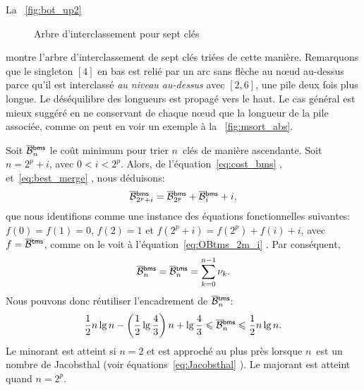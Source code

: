 La \fig~\vref{fig:bot_up2}
\begin{figure}
\centering
{}
\qquad
{}
\caption{Arbre d'interclassement pour sept clés}
\end{figure}
montre l'arbre d'interclassement
de sept clés triées de cette manière. Remarquons que le singleton
\([4]\) en bas est relié par un arc sans flèche au n{\oe}ud au-dessus
parce qu'il est interclassé \emph{au niveau au-dessus} avec \([2,6]\),
une pile deux fois plus longue. Le déséquilibre des longueurs est
propagé vers le haut. Le cas général est mieux suggéré en ne
conservant de chaque n{\oe}ud que la longueur de la pile associée,
comme on peut en voir un exemple à la \fig~\vref{fig:msort_abs}.


Soit \(\OB{\fun{bms}}{n}\) le coût
minimum pour trier \(n\)~clés de manière ascendante. Soit \(n=2^p+i\),
avec \(0 < i < 2^p\). Alors, de l'équation~\eqref{eq:cost_bms}
, et~\eqref{eq:best_merge}
, nous déduisons:
\begin{equation*}
\OB{\fun{bms}}{2^p+i} = \OB{\fun{bms}}{2^p} + \OB{\fun{bms}}{i} + i,
\end{equation*}
que nous identifions comme une instance des équations fonctionnelles
suivantes: \(f(0)=f(1)=0\), \(f(2)=1\) et \(f(2^p+i) = f(2^p) + f(i) +
i\), avec \(f=\OB{\fun{tms}}{}\), comme on le voit à
l'équation~\eqref{eq:OBtms_2m_i} . Par
conséquent,
\begin{equation}
\OB{\fun{bms}}{n} = \OB{\fun{tms}}{n} = \sum_{k=0}^{n-1}{\nu_k}.
\label{eq:OBbms}
\end{equation}
Nous pouvons donc réutiliser l'encadrement de \(\OB{\fun{tms}}{n}\):
\begin{equation}
\frac{1}{2}n\lg n - \left(\frac{1}{2}\lg\frac{4}{3}\right)n + \lg\frac{4}{3}
\leqslant \OB{\fun{bms}}{n} \leqslant
\frac{1}{2}n\lg n.
\index{bms@$\OB{\fun{bms}}{n}$}
\end{equation}
Le minorant est atteint si \(n=2\) et est approché au plus près
lorsque \(n\)~est un nombre de Jacobsthal (voir équations~\eqref{eq:Jacobsthal}
). Le majorant est atteint quand \(n=2^p\).


